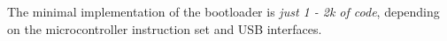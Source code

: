 The minimal implementation of the \UF bootloader is \emph{just 1 - 2k of code}, depending on the microcontroller instruction set and USB interfaces.


